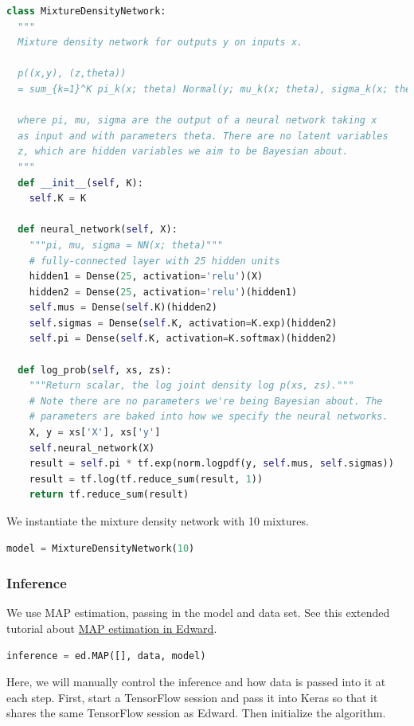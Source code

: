 \begin{lstlisting}[language=Python]
class MixtureDensityNetwork:
  """
  Mixture density network for outputs y on inputs x.

  p((x,y), (z,theta))
  = sum_{k=1}^K pi_k(x; theta) Normal(y; mu_k(x; theta), sigma_k(x; theta))

  where pi, mu, sigma are the output of a neural network taking x
  as input and with parameters theta. There are no latent variables
  z, which are hidden variables we aim to be Bayesian about.
  """
  def __init__(self, K):
    self.K = K

  def neural_network(self, X):
    """pi, mu, sigma = NN(x; theta)"""
    # fully-connected layer with 25 hidden units
    hidden1 = Dense(25, activation='relu')(X)
    hidden2 = Dense(25, activation='relu')(hidden1)
    self.mus = Dense(self.K)(hidden2)
    self.sigmas = Dense(self.K, activation=K.exp)(hidden2)
    self.pi = Dense(self.K, activation=K.softmax)(hidden2)

  def log_prob(self, xs, zs):
    """Return scalar, the log joint density log p(xs, zs)."""
    # Note there are no parameters we're being Bayesian about. The
    # parameters are baked into how we specify the neural networks.
    X, y = xs['X'], xs['y']
    self.neural_network(X)
    result = self.pi * tf.exp(norm.logpdf(y, self.mus, self.sigmas))
    result = tf.log(tf.reduce_sum(result, 1))
    return tf.reduce_sum(result)
\end{lstlisting}

We instantiate the mixture density network with 10 mixtures.

\begin{lstlisting}[language=Python]
model = MixtureDensityNetwork(10)
\end{lstlisting}

\subsubsection{Inference}

We use MAP estimation, passing
in the model and data set.
See this extended tutorial about
\href{map}{MAP estimation in Edward}.

\begin{lstlisting}[language=Python]
inference = ed.MAP([], data, model)
\end{lstlisting}

Here, we will manually control the inference and how data is passed
into it at each step. First, start a TensorFlow session and pass it
into Keras so that it shares the same TensorFlow session as Edward.
Then initialize the algorithm.

